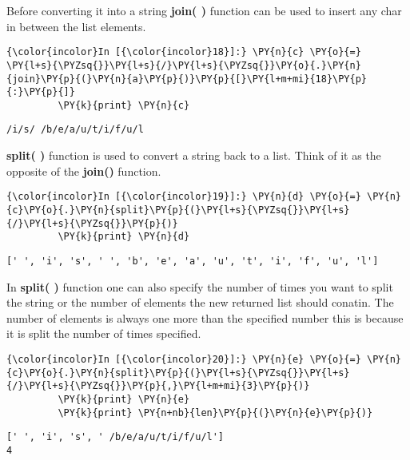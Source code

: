     Before converting it into a string \textbf{join( )} function can be used
to insert any char in between the list elements.

    \begin{Verbatim}[commandchars=\\\{\}]
{\color{incolor}In [{\color{incolor}18}]:} \PY{n}{c} \PY{o}{=} \PY{l+s}{\PYZsq{}}\PY{l+s}{/}\PY{l+s}{\PYZsq{}}\PY{o}{.}\PY{n}{join}\PY{p}{(}\PY{n}{a}\PY{p}{)}\PY{p}{[}\PY{l+m+mi}{18}\PY{p}{:}\PY{p}{]}
         \PY{k}{print} \PY{n}{c}
\end{Verbatim}

    \begin{Verbatim}[commandchars=\\\{\}]
/i/s/ /b/e/a/u/t/i/f/u/l
    \end{Verbatim}

    \textbf{split( )} function is used to convert a string back to a list.
Think of it as the opposite of the \textbf{join()} function.

    \begin{Verbatim}[commandchars=\\\{\}]
{\color{incolor}In [{\color{incolor}19}]:} \PY{n}{d} \PY{o}{=} \PY{n}{c}\PY{o}{.}\PY{n}{split}\PY{p}{(}\PY{l+s}{\PYZsq{}}\PY{l+s}{/}\PY{l+s}{\PYZsq{}}\PY{p}{)}
         \PY{k}{print} \PY{n}{d}
\end{Verbatim}

    \begin{Verbatim}[commandchars=\\\{\}]
[' ', 'i', 's', ' ', 'b', 'e', 'a', 'u', 't', 'i', 'f', 'u', 'l']
    \end{Verbatim}

    In \textbf{split( )} function one can also specify the number of times
you want to split the string or the number of elements the new returned
list should conatin. The number of elements is always one more than the
specified number this is because it is split the number of times
specified.

    \begin{Verbatim}[commandchars=\\\{\}]
{\color{incolor}In [{\color{incolor}20}]:} \PY{n}{e} \PY{o}{=} \PY{n}{c}\PY{o}{.}\PY{n}{split}\PY{p}{(}\PY{l+s}{\PYZsq{}}\PY{l+s}{/}\PY{l+s}{\PYZsq{}}\PY{p}{,}\PY{l+m+mi}{3}\PY{p}{)}
         \PY{k}{print} \PY{n}{e}
         \PY{k}{print} \PY{n+nb}{len}\PY{p}{(}\PY{n}{e}\PY{p}{)}
\end{Verbatim}

    \begin{Verbatim}[commandchars=\\\{\}]
[' ', 'i', 's', ' /b/e/a/u/t/i/f/u/l']
4
    \end{Verbatim}

